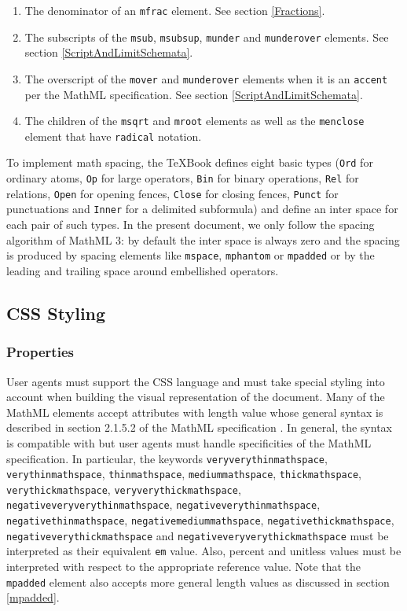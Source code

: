 \begin{enumerate}
\item The denominator of an {\tt mfrac} element. See section \ref{Fractions}.
\item The subscripts of the {\tt msub}, {\tt msubsup},
  {\tt munder} and {\tt munderover} elements.
  See section \ref{ScriptAndLimitSchemata}.
\item The overscript of the
  {\tt mover} and {\tt munderover} elements when it is an {\tt accent} per
  the MathML specification. See section \ref{ScriptAndLimitSchemata}.
\item The children of the {\tt msqrt} and {\tt mroot}
  elements as well as the {\tt menclose} element that have {\tt radical}
  notation.
\end{enumerate}

To implement math spacing, the TeXBook defines eight basic types
({\tt Ord} for ordinary atoms, {\tt Op} for large operators,
{\tt Bin} for binary operations, {\tt Rel} for relations,
{\tt Open} for opening fences, {\tt Close} for closing fences,
{\tt Punct} for punctuations and {\tt Inner} for a delimited subformula) and
define an inter space for each pair of such types. In the present document,
we only follow the spacing algorithm of MathML 3: by default the inter space
is always zero and the spacing is produced by spacing elements like
{\tt mspace}, {\tt mphantom} or {\tt mpadded} or by the leading and trailing
space around embellished operators.

\subsection{CSS Styling}

\subsubsection{Properties}\label{CSSProperties}

User agents must support the CSS language \cite{CSS2} and must take special
styling into account when building the visual representation of the document.
Many of the MathML elements accept attributes with length value whose
general syntax is described in section 2.1.5.2 of the MathML specification
\cite{MathML3}. In general,
the syntax is compatible with \cite{CSS2} but user agents must handle
specificities of the MathML specification. In particular, the keywords
{\tt veryverythinmathspace},
{\tt verythinmathspace},
{\tt thinmathspace},
{\tt mediummathspace},
{\tt thickmathspace},
{\tt verythickmathspace},
{\tt veryverythickmathspace},
{\tt negativeveryverythinmathspace},
{\tt negativeverythinmathspace},
{\tt negativethinmathspace},
{\tt negativemediummathspace},
{\tt negativethickmathspace},
{\tt negativeverythickmathspace} and
{\tt negativeveryverythickmathspace} must be interpreted as their
equivalent {\tt em} value. Also, percent and unitless values must be interpreted
with respect to the appropriate reference value. Note that the {\tt mpadded}
element also accepts more general length values as discussed in section
\ref{mpadded}.

